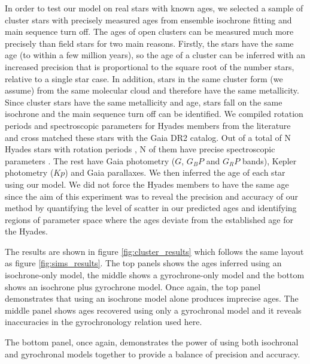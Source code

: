 In order to test our model on real stars with known ages, we selected a sample
of cluster stars with precisely measured ages from ensemble isochrone fitting
and main sequence turn off.
The ages of open clusters can be measured much more precisely than field
stars for two main reasons.
Firstly, the stars have the same age (to within a few million years), so the
age of a cluster can be inferred with an increased precision that is
proportional to the square root of the number stars, relative to a single star
case.
In addition, stars in the same cluster form (we assume) from the same
molecular cloud and therefore have the same metallicity.
Since cluster stars have the same metallicity and age, stars fall on the same
isochrone and the main sequence turn
off can be identified.
We compiled rotation periods and spectroscopic parameters for Hyades members
from the literature and cross matched these stars with the Gaia DR2 catalog.
Out of a total of N Hyades stars with rotation periods \citep{radick1987,
radick1995, hartman2011, delorme2011, douglas2016}, N of them have precise
spectroscopic parameters \citet{brewer}.
The rest have Gaia photometry ($G$, $G_BP$ and $G_RP$ bands), Kepler
photometry ($Kp$) and Gaia parallaxes.
We then inferred the age of each star using our model.
We did not force the Hyades members to have the same age since the aim of this
experiment was to reveal the precision and accuracy of our method by
quantifying the level of scatter in our predicted ages and identifying regions
of parameter space where the ages deviate from the established age for the
Hyades.

The results are shown in figure \ref{fig:cluster_results} which follows the
same layout as figure \ref{fig:sims_results}.
The top panels shows the ages inferred using an isochrone-only model, the
middle shows a gyrochrone-only model and the bottom shows an isochrone plus
gyrochrone model.
Once again, the top panel demonstrates that using an isochrone model alone
produces imprecise ages.
The middle panel shows ages recovered using only a gyrochronal model and it
reveals inaccuracies in the gyrochronology relation used here.

The bottom panel, once again, demonstrates the power of using both isochronal
and gyrochronal models together to provide a balance of precision and
accuracy.

